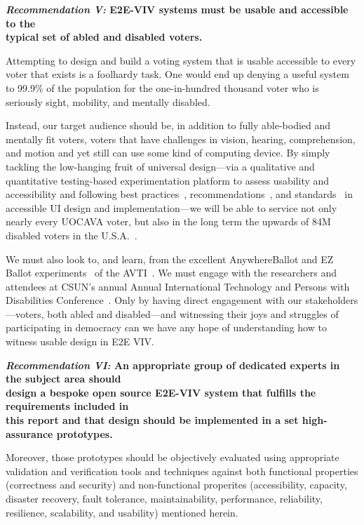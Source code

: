 \begin{center}
  \textbf{\emph{Recommendation V:} E2E-VIV systems must be usable and
  accessible to the\\
  typical set of abled and disabled voters.}
\end{center}

Attempting to design and build a voting system that is usable
accessible to every voter that exists is a foolhardy task. One would
end up denying a useful system to 99.9\% of the population for the
one-in-hundred thousand voter who is seriously sight, mobility, and
mentally disabled. 

Instead, our target audience should be, in addition to fully
able-bodied and mentally fit voters, voters that have challenges in
vision, hearing, comprehension, and motion and yet still can use some
kind of computing device. By simply tackling the low-hanging fruit of
universal design---via a qualitative and quantitative testing-based
experimentation platform to assess usability and accessibility and
following best practices~\cite{materials-at-elections.itif.org},
recommendations~\cite{WAI,Section508,WAVE}, and
standards~\cite{standards} in accessible UI design and
implementation---we will be able to service not only nearly every
UOCAVA voter, but also in the long term the upwards of 84M disabled
voters in the U.S.A.~\cite{Brennen,CensusData}. 

We must also look to, and learn, from the excellent AnywhereBallot and
EZ Ballot experiments~\cite{AnywhereBallot,EZBallot} of the
AVTI~\cite{AVTI}.  We must engage with the researchers and attendees
at CSUN's annual Annual International Technology and Persons with
Disabilities Conference~\cite{CSUN}. Only by having direct engagement
with our stakeholders---voters, both abled and disabled---and
witnessing their joys and struggles of participating in democracy can
we have any hope of understanding how to witness usable design in
E2E VIV.

\begin{center}
  \textbf{\emph{Recommendation VI:} An appropriate group of dedicated
    experts in the subject area should\\
    design a bespoke open source E2E-VIV system that fulfills the
    requirements included in\\
    this report and that design should be implemented in a set
    high-assurance prototypes.}
\end{center}

Moreover, those prototypes should be objectively evaluated using
appropriate validation and verification tools and techniques against
both functional properties (correctness and security) and
non-functional properites (accessibility, capacity, disaster recovery,
fault tolerance, maintainability, performance, reliability,
resilience, scalability, and usability) mentioned herein.


